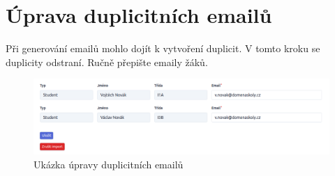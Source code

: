\section{Úprava duplicitních emailů}
Při generování emailů mohlo dojít k vytvoření duplicit. V tomto kroku se duplicity odstraní. Ručně přepište emaily žáků.

\begin{figure}[H]
    \centering
    \includegraphics[width=1\linewidth]{Figures/deduplikace.png}
    \caption{Ukázka úpravy duplicitních emailů}
    \label{fig:deduplikace}
\end{figure}


% 
